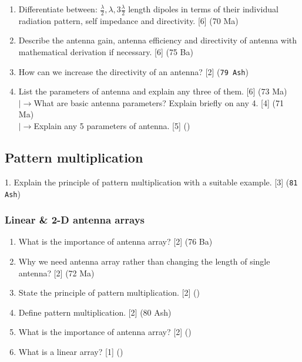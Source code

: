 \documentclass[12pt]{article}
\newcommand{\lb}{\\$\left|\rightarrow\right.$}
\begin{document}
\begin{enumerate}
      \item Differentiate between: $\frac{\lambda}{2}, \lambda, 3\frac{\lambda}{2}$ length dipoles in terms of their individual radiation pattern, self impedance and directivity. \hfill [6] (70 Ma)

      \item Describe the antenna gain, antenna efficiency and directivity of antenna with mathematical derivation if necessary. \hfill [6] (75 Ba)

      \item How can we increase the directivity of an antenna? \hfill [2] (\texttt{79 Ash})

      \item List the parameters of antenna and explain any three of them. \hfill [6] (73 Ma)
        \lb What are basic antenna parameters? Explain briefly on any 4. \hfill [4] (71 Ma)
        \lb Explain any 5 parameters of antenna. \hfill [5] ()
    \end{enumerate}

  \subsection{Pattern multiplication}
    1. Explain the principle of pattern multiplication with a suitable example. \hfill [3] (\texttt{81 Ash})

    \subsubsection{Linear \& 2-D antenna arrays}
    \begin{enumerate}
      \item What is the importance of antenna array? \hfill [2] (76 Ba)

      \item Why we need antenna array rather than changing the length of single antenna? \hfill [2] (72 Ma)

      \item State the principle of pattern multiplication. \hfill [2] ()

      \item Define pattern multiplication. \hfill [2] (80 Ash)

      \item What is the importance of antenna array? \hfill [2] ()

      \item What is a linear array? \hfill [1] ()
    \end{enumerate}
\end{document}
